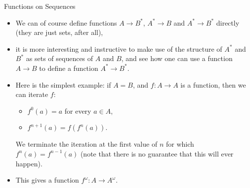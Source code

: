 \documentclass[10pt]{beamer}
\begin{document}


\begin{frame}{Functions on Sequences}


\begin{itemize}
\item We can of course define functions $A\to B^*$, $A^*\to B$ and $A^*\to B^*$ directly (they are just sets, after all),

\item it is more interesting and instructive to make use of the structure of $A^*$ and $B^*$ as sets of sequences of $A$ and $B$, and see how one can use a function $A\to B$ to define a function $A^*\to B^*$.
\item Here is the simplest example: if $A=B$, and $f:A\to A$ is a function, then we can iterate $f$:
\begin{itemize}
  \item $f^0(a)=a$ for every $a\in A$,
  \item $f^{n+1}(a) = f(f^n(a))$.
\end{itemize}
We terminate the iteration at the first value of $n$ for which $f^n(a)=f^{n-1}(a)$ (note that there is no guarantee that this will ever happen).
\item This gives a function $f^\omega:A\to A^\omega$.
\end{itemize}
\end{frame}
\end{document}
